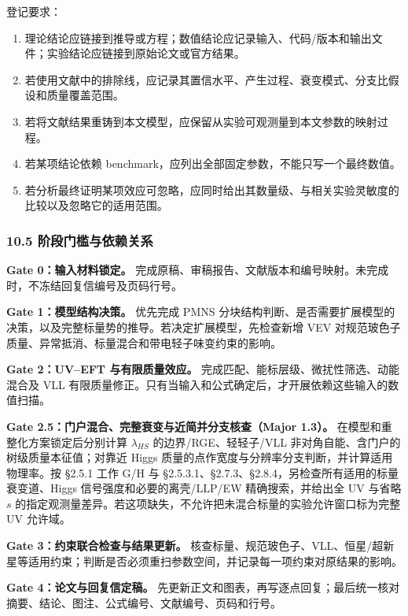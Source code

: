 \documentclass[
  chinese,
  UTF8]{ctexart}
\providecommand{\tightlist}{%
  \setlength{\itemsep}{0pt}\setlength{\parskip}{0pt}}
\begin{document}
登记要求：

\begin{enumerate}
\def\labelenumi{\arabic{enumi}.}
\tightlist
\item
  理论结论应链接到推导或方程；数值结论应记录输入、代码/版本和输出文件；实验结论应链接到原始论文或官方结果。
\item
  若使用文献中的排除线，应记录其置信水平、产生过程、衰变模式、分支比假设和质量覆盖范围。
\item
  若将文献结果重铸到本文模型，应保留从实验可观测量到本文参数的映射过程。
\item
  若某项结论依赖 benchmark，应列出全部固定参数，不能只写一个最终数值。
\item
  若分析最终证明某项效应可忽略，应同时给出其数量级、与相关实验灵敏度的比较以及忽略它的适用范围。
\end{enumerate}

\subsubsection{10.5
阶段门槛与依赖关系}\label{ux9636ux6bb5ux95e8ux69dbux4e0eux4f9dux8d56ux5173ux7cfb}

\textbf{Gate 0：输入材料锁定。}
完成原稿、审稿报告、文献版本和编号映射。未完成时，不冻结回复信编号及页码行号。

\textbf{Gate 1：模型结构决策。} 优先完成 PMNS
分块结构判断、是否需要扩展模型的决策，以及完整标量势的推导。若决定扩展模型，先检查新增
VEV 对规范玻色子质量、异常抵消、标量混合和带电轻子味变约束的影响。

\textbf{Gate 2：UV--EFT 与有限质量效应。}
完成匹配、能标层级、微扰性筛选、动能混合及 VLL
有限质量修正。只有当输入和公式确定后，才开展依赖这些输入的数值扫描。

\textbf{Gate 2.5：门户混合、完整衰变与近简并分支核查（Major 1.3）。}
在模型和重整化方案锁定后分别计算 \(\lambda_{HS}\) 的边界/RGE、轻轻子/VLL
非对角自能、含门户的树级质量本征值；对靠近 Higgs
质量的点作宽度与分辨率分支判断，并计算适用物理率。按 §2.5.1 工作 G/H 与
§2.5.3.1、§2.7.3、§2.8.4，另检查所有适用的标量衰变道、Higgs
信号强度和必要的离壳/LLP/EW 精确搜索，并给出全 UV 与省略 \(s\)
的指定观测量差异。若这项缺失，不允许把未混合标量的实验允许窗口标为完整
UV 允许域。

\textbf{Gate 3：约束联合检查与结果更新。}
核查标量、规范玻色子、VLL、恒星/超新星等适用约束；判断是否必须重扫参数空间，并记录每一项约束对原结果的影响。

\textbf{Gate 4：论文与回复信定稿。}
先更新正文和图表，再写逐点回复；最后统一核对摘要、结论、图注、公式编号、文献编号、页码和行号。
\end{document}
